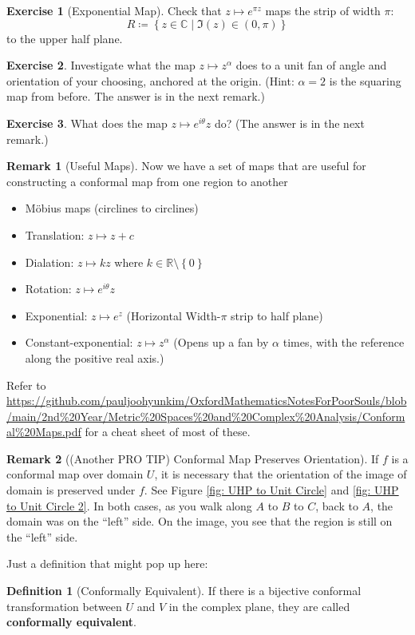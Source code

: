 \documentclass[a4paper, 12pt]{article}
\theoremstyle{definition}
\newtheorem{definition}{Definition}
\newtheorem{exercise}{Exercise}
\newtheorem{remark}{Remark}
\numberwithin{theorem}{section}
\numberwithin{definition}{section}
\numberwithin{exercise}{section}
\numberwithin{remark}{section}
\numberwithin{figure}{section}
\numberwithin{example}{section}
\newcommand{\R}{\mathbb{R}}
\newcommand{\C}{\mathbb{C}}
\begin{document}
\begin{exercise}[Exponential Map]
    Check that $z \mapsto e^{\pi z}$ maps the strip of width $\pi$:
    \begin{equation*}
        R \coloneqq \left\{ z \in \C \middle| \Im(z) \in \left( 0, \pi\right) \right\}
    \end{equation*}
    to the upper half plane.
\end{exercise}
\begin{exercise}
    Investigate what the map $z \mapsto z^{\alpha}$ does to a unit fan of angle and orientation of your choosing, anchored at the origin.
    (Hint: $\alpha = 2$ is the squaring map from before. The answer is in the next remark.)
\end{exercise}
\begin{exercise}
    What does the map $z \mapsto e^{i \theta} z$ do? (The answer is in the next remark.)
\end{exercise}
\begin{remark}[Useful Maps]
    Now we have a set of maps that are useful for constructing a conformal map from one region to another
    \begin{itemize}
        \item M\"obius maps (circlines to circlines)
        \item Translation: $z \mapsto z + c$
        \item Dialation: $z \mapsto kz$ where $k \in \R \setminus \left\{ 0 \right\}$
        \item Rotation: $z \mapsto e^{i \theta} z$
        \item Exponential: $z \mapsto e^z$ (Horizontal Width-$\pi$ strip to half plane)
        \item Constant-exponential: $z \mapsto z^{\alpha}$ (Opens up a fan by $\alpha$ times, with the reference along the positive real axis.)
    \end{itemize}
    Refer to \url{https://github.com/pauljoohyunkim/OxfordMathematicsNotesForPoorSouls/blob/main/2nd\%20Year/Metric\%20Spaces\%20and\%20Complex\%20Analysis/Conformal\%20Maps.pdf} for a cheat sheet of most of these.
\end{remark}
\begin{remark}[(Another PRO TIP) Conformal Map Preserves Orientation]
    If $f$ is a conformal map over domain $U$,
    it is necessary that the orientation of the image of domain is preserved under $f$.
    See Figure \ref{fig: UHP to Unit Circle} and \ref{fig: UHP to Unit Circle 2}.
    In both cases, as you walk along $A$ to $B$ to $C$, back to $A$, the domain was on the ``left'' side.
    On the image, you see that the region is still on the ``left'' side.
\end{remark}
Just a definition that might pop up here:
\begin{definition}[Conformally Equivalent]
    If there is a bijective conformal transformation between $U$ and $V$ in the complex plane,
    they are called \textbf{conformally equivalent}.
\end{definition}
\end{document}
